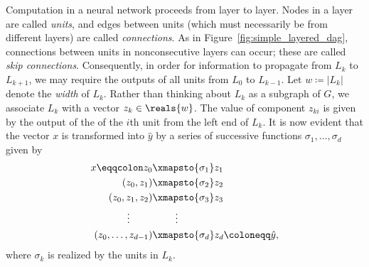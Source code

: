 \documentclass[11pt,a4paper]{article}
\numberwithin{equation}{section}
\begin{document}
Computation in a neural network proceeds from layer to layer. Nodes in a layer
are called \emph{units}, and edges between units (which must necessarily be from
different layers) are called \emph{connections}. As in
Figure~\ref{fig:simple_layered_dag}, connections between units in nonconsecutive
layers can occur; these are called \emph{skip connections}. Consequently, in
order for information to propagate from $L_k$ to $L_{k + 1}$, we may require the
outputs of all units from $L_0$ to $L_{k - 1}$. Let $w \coloneqq |L_k|$ denote
the \emph{width} of $L_k$. Rather than thinking about $L_k$ as a subgraph of
$G$, we associate $L_k$ with a vector $z_k \in \reals{w}$. The value of
component $z_{ki}$ is given by the output of the of the $i$th unit from the left
end of $L_k$. It is now evident that the vector $x$ is transformed into
$\hat{y}$ by a series of successive functions $\sigma_1, \ldots, \sigma_d$ given
by
\begin{align}
\begin{split}
	x \eqqcolon z_0 &\xmapsto{\sigma_1} z_1 \\
	(z_0, z_1) &\xmapsto{\sigma_2} z_2 \\
	(z_0, z_1, z_2) &\xmapsto{\sigma_3} z_3 \\
	\vdots\hspace{0.8cm} &\hphantom{\mapsto{\sigma_3}} \vdots \\
	(z_0, \ldots, z_{d - 1}) &\xmapsto{\sigma_d} z_d \coloneqq \hat{y},
\end{split}
\label{eq:forward_propagation}
\end{align}
where $\sigma_k$ is realized by the units in $L_k$.
\end{document}
